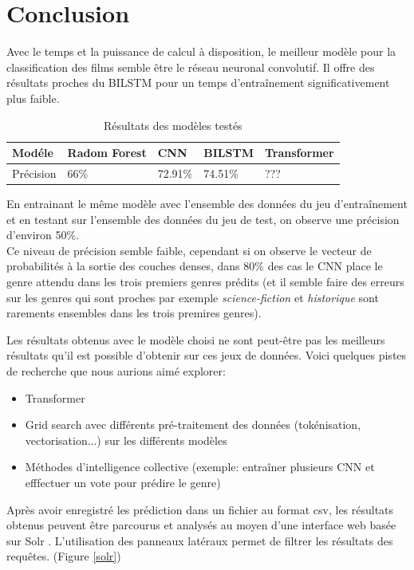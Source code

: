 \section*{Conclusion}
Avec le temps et la puissance de calcul à disposition, le meilleur modèle pour
la classification des films semble être le réseau neuronal convolutif. Il offre
des résultats proches du BILSTM pour un temps d'entraînement significativement
plus faible.

\begin{table}[]
    \begin{tabular}{|l|l|l|l|l|}
        \hline
        Modéle    & Radom Forest & CNN     & BILSTM  & Transformer \\
        \hline
        Précision & 66\%         & 72.91\% & 74.51\% & ???         \\
        \hline
    \end{tabular}
    \caption{Résultats des modèles testés}
    \label{accuracy}
\end{table}

En entrainant le même modèle avec l'ensemble des données du jeu d'entraînement et en testant sur l'ensemble des données du jeu de test, on observe une précision d'environ 50\%.\\
Ce niveau de précision semble faible, cependant si on observe le vecteur de probabilités à la sortie des couches denses, dans 80\% des cas le CNN place le genre attendu dans les trois premiers genres prédits (et il semble faire des erreurs sur les genres qui sont proches par exemple \textit{science-fiction} et \textit{historique} sont rarements ensembles dans les trois premires genres).

Les résultats obtenus avec le modèle choisi ne sont peut-être pas les meilleurs résultats qu'il est possible d'obtenir sur ces jeux de données. Voici quelques pistes de recherche que nous aurions aimé explorer:
\begin{itemize}
    \item Transformer
    \item Grid search avec différents pré-traitement des données (tokénisation, vectorisation...) sur les différents modèles
    \item Méthodes d'intelligence collective (exemple: entraîner plusieurs CNN et efffectuer un vote pour prédire le genre)
\end{itemize}

Après avoir enregistré les prédiction dans un fichier au format \textsf{csv}, les résultats obtenus peuvent être parcourus et analysés au moyen d'une interface web basée sur Solr \cite{solr}. L'utilisation des panneaux latéraux permet de filtrer les résultats des requêtes. (Figure \ref{solr})

